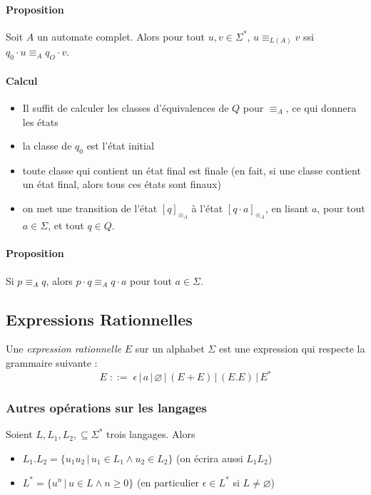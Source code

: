 \documentclass[a4paper]{article}
\begin{document}
  \paragraph{Proposition} Soit $A$ un automate complet. Alors pour tout $u,v \in \Sigma^*$,
  $u \equiv_{L(A)} v$ ssi $q_0 \cdot u \equiv_A q_O \cdot v$.

  \paragraph{Calcul}
  \begin{itemize}
    \item Il suffit de calculer les classes d'équivalences de $Q$ pour $\equiv_A$, 
    ce qui donnera les états
    \item la classe de $q_0$ est l'état initial
    \item toute classe qui contient un état final est finale (en fait, si une classe
    contient un état final, alors tous ces états sont finaux)
    \item on met une transition de l'état $[q]_{\equiv_A}$ à l'état $[q \cdot a]_{\equiv_A}$,
    en lisant $a$, pour tout $a \in \Sigma$, et tout $q \in Q$.
  \end{itemize}
  
  \paragraph{Proposition} Si $p \equiv_A q$, alors $p \cdot q \equiv_A q \cdot a$ pour tout $a \in \Sigma$.


  \subsection{Expressions Rationnelles}
  Une \textit{expression rationnelle} $E$ sur un alphabet $\Sigma$ est une expression
  qui respecte la grammaire suivante :
  $$ E\; ::=\; \epsilon\,|\, a\,|\,\varnothing\,|\, (E+E)\,|\, (E.E) \,|\, E^* $$

  \subsubsection{Autres opérations sur les langages}
  Soient $L, L_1, L_2, \subseteq \Sigma^*$ trois langages. Alors
  \begin{itemize}
    \item $L_1.L_2 = \{u_1u_2\, |\, u_1 \in L_1 \land u_2 \in L_2\}$ (on écrira aussi $L_1L_2$)
    \item $L^* = \{u^n\, |\, u \in L \land n \geq 0\}$ (en particulier $\epsilon \in L^*$ si $L \neq \varnothing$)
  \end{itemize}
\end{document}
